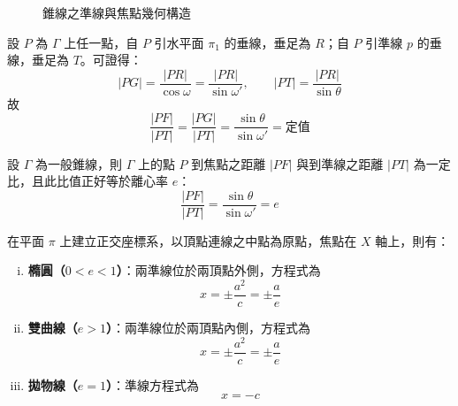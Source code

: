 \begin{figure}[H]
\caption{錐線之準線與焦點幾何構造}
\label{fig:b4s-2-5-1}
\end{figure}

設 $P$ 為 $\Gamma$ 上任一點，自 $P$ 引水平面 $\pi_1$ 的垂線，垂足為 $R$；自 $P$ 引準線 $p$ 的垂線，垂足為 $T$。可證得：
\[ |PG| = \frac{|PR|}{\cos\omega} = \frac{|PR|}{\sin\omega'}, \qquad |PT| = \frac{|PR|}{\sin\theta} \]
故
\[ \frac{|PF|}{|PT|} = \frac{|PG|}{|PT|} = \frac{\sin\theta}{\sin\omega'} = \text{定值} \]

\begin{theorem}[定理 4（準線性質）]
設 $\Gamma$ 為一般錐線，則 $\Gamma$ 上的點 $P$ 到焦點之距離 $|PF|$ 與到準線之距離 $|PT|$ 為一定比，且此比值正好等於離心率 $e$：
\begin{equation}
\frac{|PF|}{|PT|} = \frac{\sin\theta}{\sin\omega'} = e \label{eq:b4s-2-5-1}
\end{equation}
\end{theorem}

在平面 $\pi$ 上建立正交座標系，以頂點連線之中點為原點，焦點在 $X$ 軸上，則有：
\begin{enumerate}[(i)]
  \item \textbf{橢圓（$0 < e < 1$）}：兩準線位於兩頂點外側，方程式為
  \begin{equation}
  x = \pm \frac{a^2}{c} = \pm \frac{a}{e} \label{eq:b4s-2-5-ell-dir}
  \end{equation}
  \item \textbf{雙曲線（$e > 1$）}：兩準線位於兩頂點內側，方程式為
  \begin{equation}
  x = \pm \frac{a^2}{c} = \pm \frac{a}{e} \label{eq:b4s-2-5-hyp-dir}
  \end{equation}
  \item \textbf{拋物線（$e = 1$）}：準線方程式為
  \begin{equation}
  x = -c \label{eq:b4s-2-5-par-dir}
  \end{equation}
\end{enumerate}

